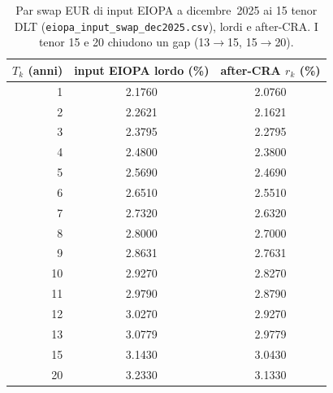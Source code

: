 \begin{table}[H]\centering\small
\caption{Par swap EUR di input EIOPA a dicembre~2025 ai 15 tenor DLT (\texttt{eiopa\_input\_swap\_dec2025.csv}), lordi e after-CRA. I tenor 15 e 20 chiudono un gap (13$\to$15, 15$\to$20).}
\label{tab:input-main-dic}\renewcommand{\arraystretch}{1.15}
\begin{tabular}{rcc}
\toprule
$T_k$ (anni) & input EIOPA lordo (\%) & after-CRA $r_k$ (\%)\\
\midrule
\rowcolor{rowtint}1 & 2.1760 & 2.0760\\
2 & 2.2621 & 2.1621\\
\rowcolor{rowtint}3 & 2.3795 & 2.2795\\
4 & 2.4800 & 2.3800\\
\rowcolor{rowtint}5 & 2.5690 & 2.4690\\
6 & 2.6510 & 2.5510\\
\rowcolor{rowtint}7 & 2.7320 & 2.6320\\
8 & 2.8000 & 2.7000\\
\rowcolor{rowtint}9 & 2.8631 & 2.7631\\
10 & 2.9270 & 2.8270\\
\rowcolor{rowtint}11 & 2.9790 & 2.8790\\
12 & 3.0270 & 2.9270\\
\rowcolor{rowtint}13 & 3.0779 & 2.9779\\
15 & 3.1430 & 3.0430\\
\rowcolor{rowtint}20 & 3.2330 & 3.1330\\
\bottomrule
\end{tabular}
\end{table}
